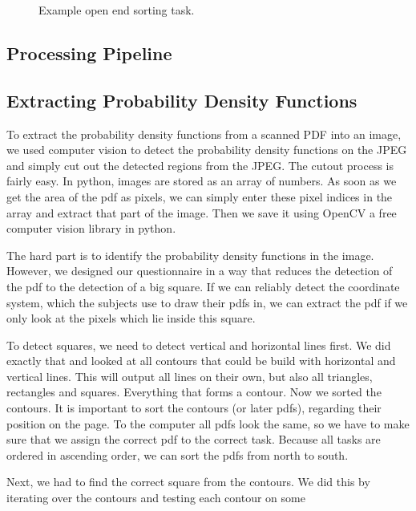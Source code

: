 \documentclass[../main/main.tex]{subfiles}
\begin{document}
	 \begin{figure}[h]
	 	\label{fig:example-task2}
	 	\centering
	 	\captionsetup{justification=centering}
	 	\caption{Example open end sorting task.}
 	\end{figure} 
	 

	\subsection{Processing Pipeline}
	
	\subsection{Extracting Probability Density Functions}
	
	To extract the probability density functions from a scanned PDF into an image, we used computer vision to detect the probability density functions on the JPEG and simply cut out the detected regions from the JPEG. The cutout process is fairly easy. In python, images are stored as an array of numbers. As soon as we get the area of the pdf as pixels, we can simply enter these pixel indices in the array and extract that part of the image. Then we save it using OpenCV a free computer vision library in python.
	
	The hard part is to identify the probability density functions in the image. However, we designed our questionnaire in a way that reduces the detection of the pdf to the detection of a big square. If we can reliably detect the coordinate system, which the subjects use to draw their pdfs in, we can extract the pdf if we only look at the pixels which lie inside this square.
	
	To detect squares, we need to detect vertical and horizontal lines first. We did exactly that and looked at all contours that could be build with horizontal and vertical lines. This will output all lines on their own, but also all triangles, rectangles and squares. Everything that forms a contour. Now we sorted the contours. It is important to sort the contours (or later pdfs), regarding their position on the page. To the computer all pdfs look the same, so we have to make sure that we assign the correct pdf to the correct task. Because all tasks are ordered in ascending order, we can sort the pdfs from north to south.
	
	Next, we had to find the correct square from the contours. We did this by iterating over the contours and testing each contour on some
\end{document}
